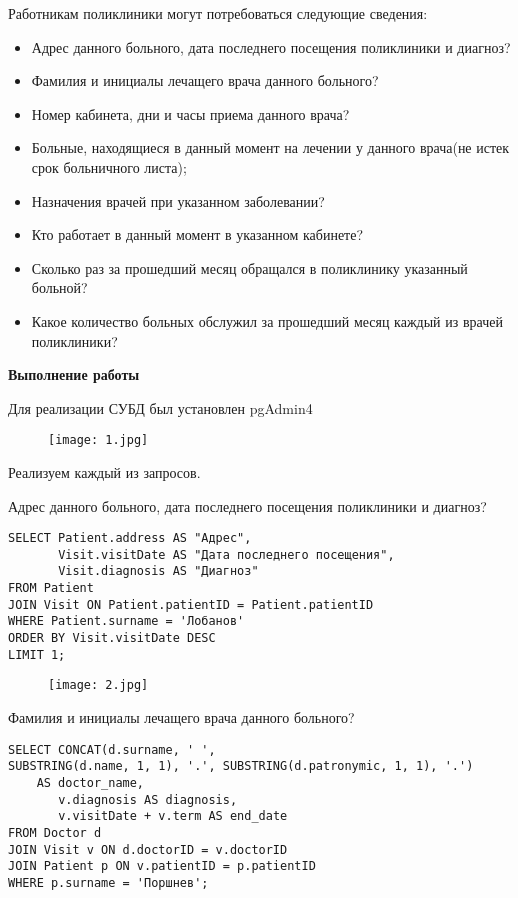 \documentclass{article}
\begin{document}
Работникам поликлиники могут потребоваться следующие сведения:

\begin{itemize}
    \item Адрес данного больного, дата последнего посещения поликлиники и диагноз?
    \item Фамилия и инициалы лечащего врача данного больного?
    \item Номер кабинета, дни и часы приема данного врача?
    \item Больные, находящиеся в данный момент на лечении у данного врача(не истек срок больничного листа);
    \item Назначения врачей при указанном заболевании?
    \item Кто работает в данный момент в указанном кабинете?
    \item Сколько раз за прошедший месяц обращался в поликлинику указанный больной?
    \item Какое количество больных обслужил за прошедший месяц каждый из врачей поликлиники?
\end{itemize}


\textbf{Выполнение работы}

Для реализации СУБД был установлен pgAdmin4

\begin{figure}[h]
\centering
\texttt{[image: 1.jpg]}
\label{fig:mpr}
\end{figure}

Реализуем каждый из запросов.

Адрес данного больного, дата последнего посещения поликлиники и диагноз?

\begin{verbatim}
SELECT Patient.address AS "Адрес",
       Visit.visitDate AS "Дата последнего посещения",
       Visit.diagnosis AS "Диагноз"
FROM Patient
JOIN Visit ON Patient.patientID = Patient.patientID
WHERE Patient.surname = 'Лобанов'
ORDER BY Visit.visitDate DESC
LIMIT 1;
\end{verbatim}

\begin{figure}[h]
\centering
\texttt{[image: 2.jpg]}
\label{fig:mpr}
\end{figure}

Фамилия и инициалы лечащего врача данного больного?

\begin{verbatim}
SELECT CONCAT(d.surname, ' ', 
SUBSTRING(d.name, 1, 1), '.', SUBSTRING(d.patronymic, 1, 1), '.') 
    AS doctor_name,
       v.diagnosis AS diagnosis,
       v.visitDate + v.term AS end_date
FROM Doctor d
JOIN Visit v ON d.doctorID = v.doctorID
JOIN Patient p ON v.patientID = p.patientID
WHERE p.surname = 'Поршнев';
\end{verbatim}
\end{document}
